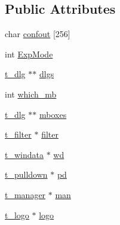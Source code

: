 \subsection*{\-Public \-Attributes}
\begin{DoxyCompactItemize}
\item 
char \hyperlink{structt__gmx_aa0a7654727c66793a81d7038faa8c7b6}{confout} \mbox{[}256\mbox{]}
\item 
int \hyperlink{structt__gmx_a05400aa5fd890e83f8999fc56701d1de}{\-Exp\-Mode}
\item 
\hyperlink{structt__dlg}{t\-\_\-dlg} $\ast$$\ast$ \hyperlink{structt__gmx_ad77837849b5d231ff8eb2d9eaa0d78c1}{dlgs}
\item 
int \hyperlink{structt__gmx_a3fe5fa106e34a686f0edd92b940fa599}{which\-\_\-mb}
\item 
\hyperlink{structt__dlg}{t\-\_\-dlg} $\ast$$\ast$ \hyperlink{structt__gmx_acc41237c73f991a76e3721c59a3dddba}{mboxes}
\item 
\hyperlink{structt__filter}{t\-\_\-filter} $\ast$ \hyperlink{structt__gmx_a050043e4c1971cac327ab6752242badb}{filter}
\item 
\hyperlink{structt__windata}{t\-\_\-windata} $\ast$ \hyperlink{structt__gmx_ab207676186a55123991edee52ad8c9fd}{wd}
\item 
\hyperlink{structt__pulldown}{t\-\_\-pulldown} $\ast$ \hyperlink{structt__gmx_a5fb5ca1df22a7c57032156261c1b5740}{pd}
\item 
\hyperlink{structt__manager}{t\-\_\-manager} $\ast$ \hyperlink{structt__gmx_a29ee57842ce2596445e2b55d79bbf471}{man}
\item 
\hyperlink{structt__logo}{t\-\_\-logo} $\ast$ \hyperlink{structt__gmx_a03c1e3bcc269b8122c5da050a26e6812}{logo}
\end{DoxyCompactItemize}



